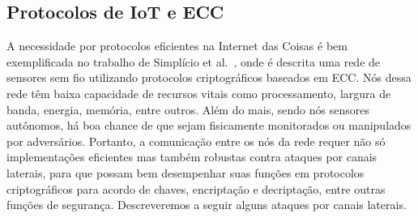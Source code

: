 \documentclass{SBCbookchapter}
\begin{document}
\subsection{Protocolos de IoT e ECC}

A necessidade por protocolos eficientes na Internet das Coisas é bem exemplificada no trabalho de Simplício et al.~\cite{SimplicioJr2016}, onde é descrita uma rede de sensores sem fio utilizando protocolos criptográficos baseados em ECC. Nós dessa rede têm baixa capacidade de recursos vitais como processamento, largura de banda, energia, memória, entre outros. Além do mais, sendo nós sensores autônomos, há boa chance de que sejam fisicamente monitorados ou manipulados por adversários.   Portanto, a comunicação entre os nós da rede requer não só implementações eficientes mas também robustas contra ataques por canais laterais, para que possam bem desempenhar suas funções em protocolos criptográficos  para acordo de chaves, encriptação e decriptação, entre outras funções de segurança. Descreveremos a seguir alguns ataques por canais laterais.
\end{document}
